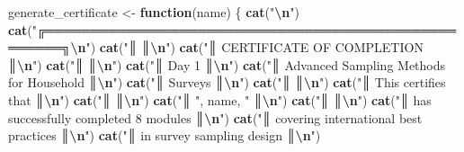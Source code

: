 \documentclass[
]{article}
\newenvironment{Shaded}{\begin{snugshade}}{\end{snugshade}}
\newcommand{\ControlFlowTok}[1]{\textcolor[rgb]{0.13,0.29,0.53}{\textbf{#1}}}
\newcommand{\FunctionTok}[1]{\textcolor[rgb]{0.13,0.29,0.53}{\textbf{#1}}}
\newcommand{\NormalTok}[1]{#1}
\newcommand{\OtherTok}[1]{\textcolor[rgb]{0.56,0.35,0.01}{#1}}
\newcommand{\SpecialCharTok}[1]{\textcolor[rgb]{0.81,0.36,0.00}{\textbf{#1}}}
\newcommand{\StringTok}[1]{\textcolor[rgb]{0.31,0.60,0.02}{#1}}
\begin{document}
\begin{Shaded}
\begin{Highlighting}[]
\NormalTok{generate\_certificate }\OtherTok{\textless{}{-}} \ControlFlowTok{function}\NormalTok{(name) \{}
  \FunctionTok{cat}\NormalTok{(}\StringTok{"}\SpecialCharTok{\textbackslash{}n}\StringTok{"}\NormalTok{)}
  \FunctionTok{cat}\NormalTok{(}\StringTok{"╔════════════════════════════════════════════════════╗}\SpecialCharTok{\textbackslash{}n}\StringTok{"}\NormalTok{)}
  \FunctionTok{cat}\NormalTok{(}\StringTok{"║                                                    ║}\SpecialCharTok{\textbackslash{}n}\StringTok{"}\NormalTok{)}
  \FunctionTok{cat}\NormalTok{(}\StringTok{"║            CERTIFICATE OF COMPLETION               ║}\SpecialCharTok{\textbackslash{}n}\StringTok{"}\NormalTok{)}
  \FunctionTok{cat}\NormalTok{(}\StringTok{"║                                                    ║}\SpecialCharTok{\textbackslash{}n}\StringTok{"}\NormalTok{)}
  \FunctionTok{cat}\NormalTok{(}\StringTok{"║                    Day 1                           ║}\SpecialCharTok{\textbackslash{}n}\StringTok{"}\NormalTok{)}
  \FunctionTok{cat}\NormalTok{(}\StringTok{"║     Advanced Sampling Methods for Household       ║}\SpecialCharTok{\textbackslash{}n}\StringTok{"}\NormalTok{)}
  \FunctionTok{cat}\NormalTok{(}\StringTok{"║                    Surveys                        ║}\SpecialCharTok{\textbackslash{}n}\StringTok{"}\NormalTok{)}
  \FunctionTok{cat}\NormalTok{(}\StringTok{"║                                                    ║}\SpecialCharTok{\textbackslash{}n}\StringTok{"}\NormalTok{)}
  \FunctionTok{cat}\NormalTok{(}\StringTok{"║              This certifies that                  ║}\SpecialCharTok{\textbackslash{}n}\StringTok{"}\NormalTok{)}
  \FunctionTok{cat}\NormalTok{(}\StringTok{"║                                                    ║}\SpecialCharTok{\textbackslash{}n}\StringTok{"}\NormalTok{)}
  \FunctionTok{cat}\NormalTok{(}\StringTok{"║                 "}\NormalTok{, name, }\StringTok{"                        ║}\SpecialCharTok{\textbackslash{}n}\StringTok{"}\NormalTok{)}
  \FunctionTok{cat}\NormalTok{(}\StringTok{"║                                                    ║}\SpecialCharTok{\textbackslash{}n}\StringTok{"}\NormalTok{)}
  \FunctionTok{cat}\NormalTok{(}\StringTok{"║     has successfully completed 8 modules          ║}\SpecialCharTok{\textbackslash{}n}\StringTok{"}\NormalTok{)}
  \FunctionTok{cat}\NormalTok{(}\StringTok{"║     covering international best practices         ║}\SpecialCharTok{\textbackslash{}n}\StringTok{"}\NormalTok{)}
  \FunctionTok{cat}\NormalTok{(}\StringTok{"║           in survey sampling design               ║}\SpecialCharTok{\textbackslash{}n}\StringTok{"}\NormalTok{)}

\end{Highlighting}
\end{Shaded}
\end{document}
